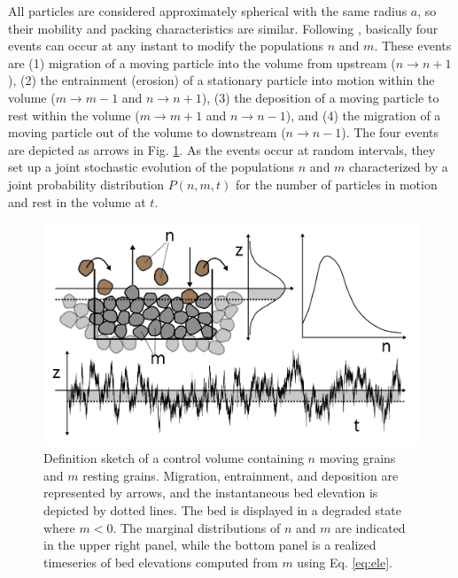 All particles are considered approximately spherical with the same radius $a$, so their mobility and packing characteristics are similar.
Following \citet{Ancey2008}, basically four events can occur at any instant to modify the populations $n$ and $m$.
These events are (1) migration of a moving particle into the volume from upstream ($n \rightarrow n+1$), (2) the entrainment (erosion) of a stationary particle into motion within the volume ($m\rightarrow m-1$ and $n\rightarrow n+1$), (3) the deposition of a moving particle to rest within the volume ($m\rightarrow m+1$ and $n\rightarrow n-1$), and (4) the migration of a moving particle out of the volume to downstream ($n\rightarrow n-1$).
The four events are depicted as arrows in Fig. \ref{fig:eledefinition}.
As the events occur at random intervals, they set up a joint stochastic evolution of the populations $n$ and $m$ characterized by a joint probability distribution $P(n,m,t)$ for the number of particles in motion and rest in the volume at $t$.
\begin{figure}[!htbp]
	\includegraphics[width=\linewidth,keepaspectratio]{./figures/ch3/improveddef.png}
	\caption{Definition sketch of a control volume containing $n$ moving grains and $m$ resting grains. Migration, entrainment, and deposition are represented by arrows, and the instantaneous bed elevation is depicted by dotted lines. The bed is displayed in a degraded state where $m<0$. The marginal distributions of $n$ and $m$ are indicated in the upper right panel, while the bottom panel is a realized timeseries of bed elevations computed from $m$ using Eq. \ref{eq:ele}.}
	\label{fig:eledefinition}
\end{figure}

